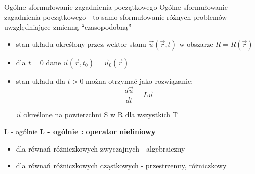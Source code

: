 \begin{frame}{Ogólne sformułowanie zagadnienia początkowego}
  Ogólne sformułowanie zagadnienia początkowego - to samo sformułowanie różnych problemów uwzględniające zmienną ``czasopodobną'' 
  \begin{itemize}
    \item stan układu określony przez wektor stanu $\vec{u}(\vec{r},t)$ w obszarze $R = R(\vec{r})$
    \item dla $ t = 0 $ dane $\vec{u}(\vec{r},t_0) = \vec{u}_0(\vec{r})$
    \item stan układu dla $ t > 0$ można otrzymać jako rozwiązanie:
    $$\frac{d\vec{u}}{dt} = L\vec{u}$$ \par
    \begin{center}
    	$\vec{u}$ określone na powierzchni S w R dla wszystkich T
    \end{center}
  \end{itemize}
  
\end{frame}
\begin{frame}{L - ogólnie}
	\textbf{L - ogólnie : operator nieliniowy}
  \begin{itemize}
    \item dla równań różniczkowych zwyczajnych - algebraiczny
    \item dla równań różniczkowych cząstkowych - przestrzenny, różniczkowy
  \end{itemize}
\end{frame}